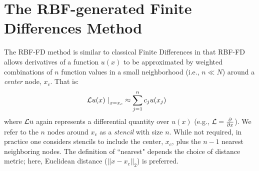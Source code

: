 \documentclass[11pt]{report}
\begin{document}
{%
%
%
%




\section{The RBF-generated Finite Differences Method}
The RBF-FD method is similar to classical Finite Differences in that RBF-FD allows derivatives of a function $u(x)$ to be approximated by weighted combinations of $n$ function values in a small neighborhood (i.e., $n \ll N$) around a \emph{center} node, $x_c$. That is: 
        \begin{align} 
        \left. \mathcal{L}u(x) \ \right|_{x = x_c} &\approx \sum_{j=1}^{n} c_j u(x_j) 
        \label{eq:derivFromFDWeights}
        \end{align}
where $\mathcal{L}u$ again represents a differential quantity over $u(x)$ (e.g., $\mathcal{L} = \frac{\partial }{\partial x}$). We refer to the $n$ nodes around $x_c$ as a \emph{stencil} with size $n$. While not required, in practice one considers stencils to include the center, $x_c$, plus the $n - 1$ nearest neighboring nodes. The definition of ``nearest" depends the choice of distance metric; here, Euclidean distance ($||x-x_c||_2$) is preferred. 

}
\end{document}
